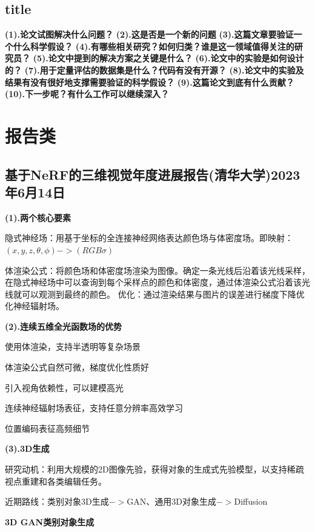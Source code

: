 \documentclass[12pt, a4paper, oneside]{ctexart}
\begin{document}
    \subsection{title}
    \noindent\textbf{(1).论文试图解决什么问题？}
    \noindent\textbf{(2).这是否是一个新的问题}
    \noindent\textbf{(3).这篇文章要验证一个什么科学假设？}
    \noindent\textbf{(4).有哪些相关研究？如何归类？谁是这一领域值得关注的研究员？}
    \noindent\textbf{(5).论文中提到的解决方案之关键是什么？}
    \noindent\textbf{(6).论文中的实验是如何设计的？}
    \noindent\textbf{(7).用于定量评估的数据集是什么？代码有没有开源？}
    \noindent\textbf{(8).论文中的实验及结果有没有很好地支撑需要验证的科学假设？}
    \noindent\textbf{(9).这篇论文到底有什么贡献？}
    \noindent\textbf{(10).下一步呢？有什么工作可以继续深入？}

    \section{报告类}
    \subsection{基于NeRF的三维视觉年度进展报告(清华大学)\quad2023年6月14日}
    \noindent\textbf{(1).两个核心要素}

    隐式神经场：用基于坐标的全连接神经网络表达颜色场与体密度场。即映射：$(x,y,z,\theta,\phi)->(RGB\sigma)$

    体渲染公式：将颜色场和体密度场渲染为图像。确定一条光线后沿着该光线采样，在隐式神经场中可以查询到每个采样点的颜色和体密度，通过体渲染公式沿着该光线就可以观测到最终的颜色。
    优化：通过渲染结果与图片的误差进行梯度下降优化神经辐射场。

    \noindent\textbf{(2).连续五维全光函数场的优势}

    使用体渲染，支持半透明等复杂场景

    体渲染公式自然可微，梯度优化性质好

    引入视角依赖性，可以建模高光

    连续神经辐射场表征，支持任意分辨率高效学习

    位置编码表征高频细节

    \noindent\textbf{(3).3D生成}

    研究动机：利用大规模的2D图像先验，获得对象的生成式先验模型，以支持稀疏视点重建和各类编辑任务。

    近期路线：类别对象3D生成$->$GAN、通用3D对象生成$->$Diffusion

    \noindent\textbf{3D GAN类别对象生成}
\end{document}
